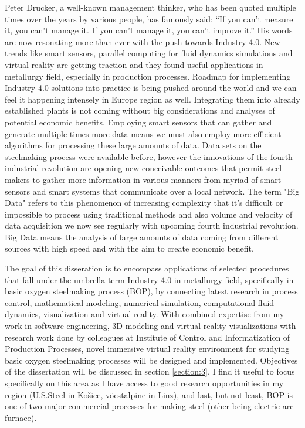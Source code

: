 Peter Drucker, a well-known management thinker, who has been quoted multiple times over the years by various people, has famously said: “If you can't measure it, you can't manage it. If you can't manage it, you can't improve it.” His words are now resonating more than ever with the push towards Industry 4.0. New trends like smart sensors, parallel computing for fluid dynamics simulations and virtual reality are getting traction and they found useful applications in metallurgy field, especially in production processes. Roadmap for implementing Industry 4.0 solutions into practice is being pushed around the world and we can feel it happening intensely in Europe region as well. Integrating them into already established plants is not coming without big considerations and analyses of potential economic benefits. Employing smart sensors that can gather and generate multiple-times more data means we must also employ more efficient algorithms for processing these large amounts of data. Data sets on the steelmaking process were available before, however the innovations of the fourth industrial revolution are opening new conceivable outcomes that permit steel makers to gather more information in various manners from myriad of smart sensors and smart systems that communicate over a local network. The term "Big Data" refers to this phenomenon of increasing complexity that it’s difficult or impossible to process using traditional methods and also volume and velocity of data acquisition we now see regularly with upcoming fourth industrial revolution. Big Data means the analysis of large amounts of data coming from different sources with high speed and with the aim to create economic benefit.

The goal of this disseration is to encompass applications of selected procedures that fall under the umbrella term Industry 4.0 in metallurgy field, specifically in basic oxygen steelmaking process (BOP), by connecting latest research in process control, mathematical modeling, numerical simulation, computational fluid dynamics, visualization and virtual reality. With combined expertise from my work in software engineering, 3D modeling and virtual reality visualizations with research work done by colleagues at Institute of Control and Informatization of Production Processes, novel immersive virtual reality environment for studying basic oxygen steelmaking processes will be designed and implemented. Objectives of the dissertation will be discussed in section \ref{section:3}. I find it useful to focus specifically on this area as I have access to good research opportunities in my region (U.S.Steel in Košice, v\"{o}estalpine in Linz), and last, but not least, BOP is one of two major commercial processes for making steel (other being electric arc furnace).

